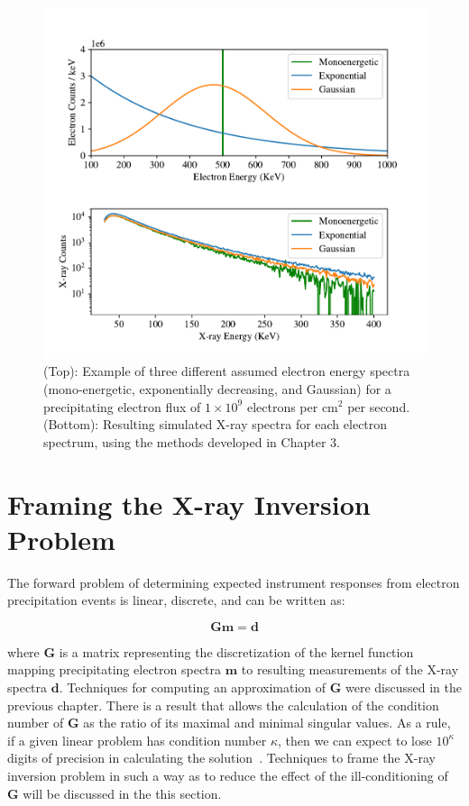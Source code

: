 \begin{figure}[p]
\label{why_ill_conditioned}
\centering
\includegraphics[width=\textwidth]{figures/chapter_4/why_ill_conditioned/why_ill_conditioned.pdf}
\caption{(Top): Example of three different assumed electron energy spectra (mono-energetic, exponentially decreasing, and Gaussian) for a precipitating electron flux of $1\times10^9$ electrons per $\mbox{cm}^2$ per second. (Bottom): Resulting simulated X-ray spectra for each electron spectrum, using the methods developed in Chapter 3.} 
\end{figure}

\section{Framing the X-ray Inversion Problem}

The forward problem of determining expected instrument responses from electron precipitation events is linear, discrete, and can be written as:

$$\mathbf{G}\mathbf{m} = \mathbf{d}$$

where $\mathbf{G}$ is a matrix representing the discretization of the kernel function mapping precipitating electron spectra $\mathbf{m}$ to resulting measurements of the X-ray spectra $\mathbf{d}$. Techniques for computing an approximation of $\mathbf{G}$ were discussed in the previous chapter. There is a result that allows the calculation of the condition number of $\mathbf{G}$ as the ratio of its maximal and minimal singular values. As a rule, if a given linear problem has condition number $\kappa$, then we can expect to lose $10^\kappa$ digits of precision in calculating the solution~\citep{Cheney2008}. Techniques to frame the X-ray inversion problem in such a way as to reduce the effect of the ill-conditioning  of $\mathbf{G}$ will be discussed in the this section.

